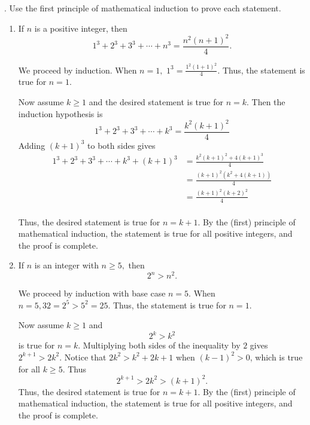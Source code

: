 \documentclass{ximera}
\begin{document}
\begin{br}
. Use the first principle of mathematical induction to prove each statement.
\begin{enumerate}%
\addtocounter{enumi}{1}
  \item If $n$ is a positive integer, then 
  \[1^3+2^3+3^3+\cdots+n^3=\frac{n^2(n+1)^2}{4}.\]
  
\begin{solution}
 	We proceed by induction.  When $n=1,$ $1^3=\frac{1^2(1+1)^2}{4}$. Thus, the statement is true for $n=1.$
                        
            
                        Now assume $k\geq 1$ and the desired statement is true for $n=k$. Then the induction hypothesis is 
                            \[1^3+2^3+3^3+\cdots+k^3=\frac{k^2(k+1)^2}{4}\]
                        Adding $(k+1)^3$ to both sides gives
                            \begin{align*}
                                 1^3+2^3+3^3+\cdots+k^3+(k+1)^3 &=\frac{k^2(k+1)^2+4(k+1)^3}{4}\\
                                 &= \frac{(k+1)^2(k^2+4(k+1))}{4}\\
                                 &= \frac{(k+1)^2(k+2)^2}{4}\\
                            \end{align*}
                        
                        Thus, the desired statement is true for $n=k+1$. By the (first) principle of mathematical induction, the statement is true for all positive integers, and the proof is complete.
\end{solution}
 \item If $n$ is an integer with $n\geq 5,$ then \[2^n>n^2.\]
 
\begin{solution}
                            We proceed by induction with base case $n=5$. When $n=5, 32=2^5\gt 5^2=25$. Thus, the statement is true for $n=1.$
                        
            
                        Now assume $k\geq 1$ and \[2^k\gt k^2\] is true for $n=k$. Multiplying both sides of the inequality by $2$ gives $2^{k+1} \gt 2k^2$. Notice that $2k^2 \gt k^2 +2k+1$ when $(k-1)^2\gt 0$, which is true for all $k\geq 5$. Thus 
                            \[ 2^{k+1} \gt 2k^2 \gt (k+1)^2.\]
                        Thus, the desired statement is true for $n=k+1$. By the (first) principle of mathematical induction, the statement is true for all positive integers, and the proof is complete.
\end{solution}
\end{enumerate}
\end{br}







\end{document}

